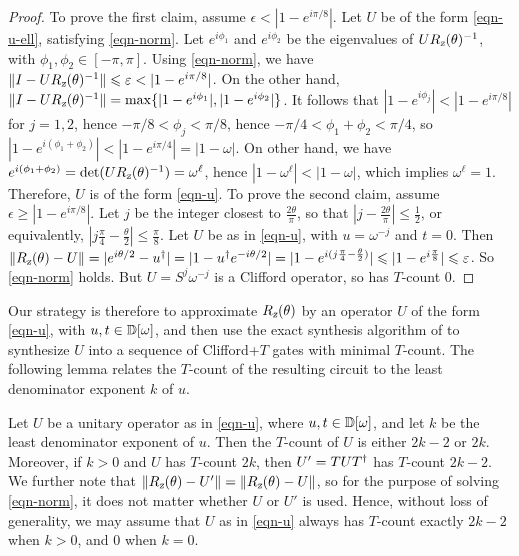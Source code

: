 \documentclass{article}
\begin{document}
\begin{proof}
  To prove the first claim, assume $\epsilon<|1-e^{i\pi/8}|$.  Let $U$
  be of the form {\eqref{eqn-u-ell}}, satisfying
  {\eqref{eqn-norm}}. Let $e^{i\phi_1}$ and $e^{i\phi_2}$ be the
  eigenvalues of $UR_{\textsl{z}}(\theta)^{-1}$, with
  $\phi_1,\phi_2\in[-\pi,\pi]$.  Using {\eqref{eqn-norm}}, we have
  $\|I-UR_{\textsl{z}}(\theta)^{-1}\|\leqslant\varepsilon< |1-e^{i\pi/8}|$.  On the
  other hand, $\|I-UR_{\textsl{z}}(\theta)^{-1}\| = \max\{|1-e^{i\phi_1}|,
    |1-e^{i\phi_2}|\}$. It follows that $|1-e^{i\phi_j}| <
  |1-e^{i\pi/8}|$ for $j=1,2$, hence $-\pi/8<\phi_j<\pi/8$, hence
  $-\pi/4<\phi_1+\phi_2<\pi/4$, so $|1-e^{i(\phi_1+\phi_2)}| <
  |1-e^{i\pi/4}| = |1-\omega|$.  On other hand, we have
  $e^{i(\phi_1+\phi_2)} = \det(UR_{\textsl{z}}(\theta)^{-1}) = \omega^\ell$, hence
  $|1-\omega^\ell|<|1-\omega|$, which implies
  $\omega^\ell=1$. Therefore, $U$ is of the form {\eqref{eqn-u}}.  To
  prove the second claim, assume $\epsilon\geq|1-e^{i\pi/8}|$. Let $j$
  be the integer closest to $\frac{2\theta}{\pi}$, so that
  $|j-\frac{2\theta}{\pi}|\leq\frac{1}{2}$, or equivalently,
  $|j\frac{\pi}{4}-\frac{\theta}{2}| \leq \frac{\pi}{8}$. Let $U$ be
  as in {\eqref{eqn-u}}, with $u=\omega^{-j}$ and $t=0$.  Then
  $\|R_{\textsl{z}}(\theta) - U\| = |e^{i\theta/2} - u^{\dagger}| = |1 - u^{\dagger}
  e^{-i\theta/2}| = |1 - e^{i(j\frac{\pi}{4}-\frac{\theta}{2})}| \leqslant
  |1 - e^{i\frac{\pi}{8}}| \leqslant \varepsilon$. So {\eqref{eqn-norm}}
  holds. But $U=S^j\omega^{-j}$ is a Clifford operator, so has
  $T$-count 0.
\end{proof}

Our strategy is therefore to approximate $R_{\textsl{z}}(\theta)$ by an operator 
$U$ of the form {\eqref{eqn-u}}, with $u,t\in{\mathbb{D}}[\omega]$, and then use 
the exact synthesis algorithm of {\cite{Kliuchnikov-etal}} to synthesize 
$U$ into a sequence of Clifford+$T$ gates with minimal $T$-count. The 
following lemma relates the $T$-count of the resulting circuit to the 
least denominator exponent $k$ of $u$.

\begin{lemma}\label{lem-2k-2}
  Let $U$ be a unitary operator as in {\eqref{eqn-u}}, where
  $u,t\in{\mathbb{D}}[\omega]$, and let $k$ be the least denominator exponent of
  $u$. Then the $T$-count of $U$ is either $2k-2$ or $2k$. Moreover,
  if $k>0$ and $U$ has $T$-count $2k$, then $U'=TUT^{\dagger}$ has $T$-count
  $2k-2$.  We further note that $\|R_{\textsl{z}}(\theta) - U'\| =
  \|R_{\textsl{z}}(\theta) - U\|$, so for the purpose of solving
  {\eqref{eqn-norm}}, it does not matter whether $U$ or $U'$ is
  used. Hence, without loss of generality, we may assume that $U$ as
  in {\eqref{eqn-u}} always has $T$-count exactly $2k-2$ when $k>0$,
  and $0$ when $k=0$.
\end{lemma}
\end{document}
